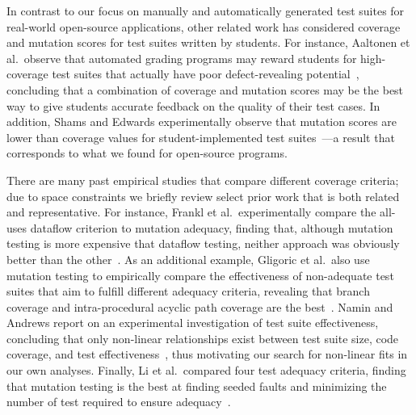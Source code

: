 In contrast to our focus on manually and automatically generated test suites for real-world open-source applications, other related work has considered coverage and mutation scores for test suites written by students. For instance, Aaltonen et al.\ observe that automated grading programs may reward students for high-coverage test suites that actually have poor defect-revealing potential~\cite{aaltonen:2010:mav:1869542.1869567}, concluding that a combination of coverage and mutation scores may be the best way to give students accurate feedback on the quality of their test cases.  In addition, Shams and Edwards experimentally observe that mutation scores are lower than coverage values for student-implemented test suites~\cite{shams2013}---a result that corresponds to what we found for open-source programs.

There are many past empirical studies that compare different coverage criteria; due to space constraints we briefly review select prior work that is both related and representative. For instance, Frankl et al.\ experimentally compare the all-uses dataflow criterion to mutation adequacy, finding that, although mutation testing is more expensive that dataflow testing, neither approach was obviously better than the other~\cite{frankl1997}. As an additional example, Gligoric et al.\ also use mutation testing to empirically compare the effectiveness of non-adequate test suites that aim to fulfill different adequacy criteria, revealing that branch coverage and intra-procedural acyclic path coverage are the best~\cite{gligoric2013}. Namin and Andrews report on an experimental investigation of test suite effectiveness, concluding that only non-linear relationships exist between test suite size, code coverage, and test effectiveness~\cite{namin2009}, thus motivating our search for non-linear fits in our own analyses. Finally, Li et al.\ compared four test adequacy criteria, finding that mutation testing is the best at finding seeded faults and minimizing the number of test required to ensure adequacy~\cite{li2009}.


